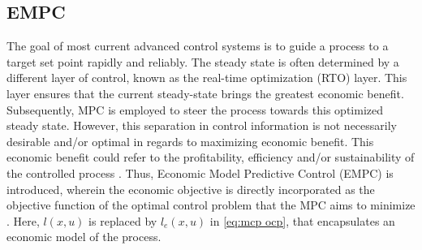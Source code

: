 \subsection{EMPC}
The goal of most current advanced control systems is to guide a process to a target set point rapidly and reliably. The steady state is often determined by a different layer of control, known as the real-time optimization (RTO) layer. This layer ensures that the current steady-state brings the greatest economic benefit. Subsequently, MPC is employed to steer the process towards this optimized steady state. However, this separation in control information is not necessarily desirable and/or optimal in regards to maximizing economic benefit. This economic benefit could refer to the profitability, efficiency and/or sustainability of the controlled process \cite{ellisTutorialReviewEconomic2014}. Thus, Economic Model Predictive Control (EMPC) is introduced, wherein the economic objective is directly incorporated as the objective function of the optimal control problem that the MPC aims to minimize \cite{rawlingsFundamentalsEconomicModel2012}. Here, $l(x,u)$ is replaced by $l_e(x,u)$ in \autoref{eq:mcp ocp}, 
that encapsulates an economic model of the process.

